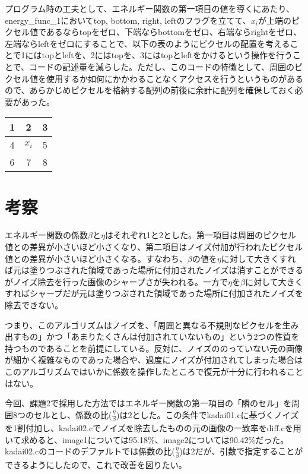 \documentclass[11pt, oneside]{jsarticle}   	%
\begin{document}
    プログラム時の工夫として、エネルギー関数の第一項目の値を導くにあたり、energy\_func\_1においてtop, bottom, right, leftのフラグを立てて、$x_i$が上端のピクセル値であるならtopをゼロ、下端ならbottomをゼロ、右端ならrightをゼロ、左端ならleftをゼロにすることで、以下の表のようにピクセルの配置を考えることで1にはtopとleftを、2にはtopを、3にはtopとleftをかけるという操作を行うことで、コードの記述量を減らした。ただし、このコードの特徴として、周囲のピクセル値を使用するか如何にかかわることなくアクセスを行うというものがあるので、あらかじめピクセルを格納する配列の前後に余計に配列を確保しておく必要があった。

    \begin{table}[ht]
        \centering
        \begin{tabular}{|c|c|c|} \hline
            1 & 2     & 3 \\     \hline
            4 & $x_i$ & 5 \\     \hline
            6 & 7     & 8 \\     \hline
        \end{tabular}
    \end{table}

\section*{考察}
    エネルギー関数の係数$\beta$と$\eta$はそれぞれ1と2とした。第一項目は周囲のピクセル値との差異が小さいほど小さくなり、第二項目はノイズ付加が行われたピクセル値との差異が小さいほど小さくなる。すなわち、$\beta$の値を$\eta$に対して大きくすれば元は塗りつぶされた領域であった場所に付加されたノイズは消すことができるがノイズ除去を行った画像のシャープさが失われる。一方で$\eta$を$\beta$に対して大きくすればシャープだが元は塗りつぶされた領域であった場所に付加されたノイズを除去できない。


    つまり、このアルゴリズムはノイズを、「周囲と異なる不規則なピクセルを生み出すもの」かつ「あまりたくさんは付加されていないもの」という2つの性質を持つものであることを前提にしている。反対に、ノイズののっていない元の画像が細かく複雑なものであった場合や、過度にノイズが付加されてしまった場合はこのアルゴリズムではいかに係数を操作したところで復元が十分に行われることはない。

    今回、課題2で採用した方法ではエネルギー関数の第一項目の「隣のセル」を周囲8つのセルとし、係数の比($\frac{\eta}{\beta}$)は2とした。この条件でkadai01.cに基づくノイズを1割付加し、kadai02.cでノイズを除去したものの元の画像の一致率をdiff.cを用いて求めると、image1については95.18\%、image2については90.42\%だった。kadai02.cのコードのデファルトでは係数の比($\frac{\eta}{\beta}$)は2だが、引数で指定することができるようにしたので、これで改善を図りたい。
\end{document}
